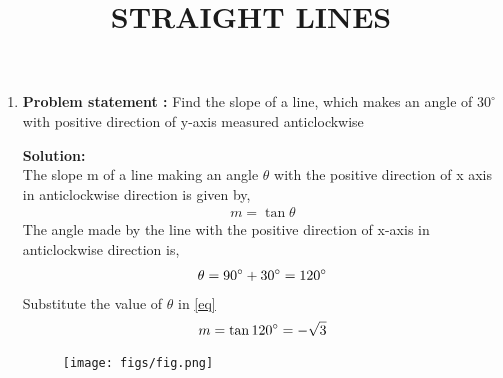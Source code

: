 \documentclass[12pt]{article}
\newcommand{\solution}{\noindent \textbf{Solution: }}
\begin{document}
\begin{center}
\title{\textbf{STRAIGHT LINES}}
\maketitle
\end{center}
\begin{enumerate}
\item\textbf{Problem statement :} Find the slope of a line, which makes an angle of $30^\circ$ with positive direction of y-axis measured anticlockwise

\solution
\\
The slope m of a line making an angle $\theta$ with the positive direction of x axis in anticlockwise direction is given by,
\begin{align}
    m=\tan\theta
    \label{eq}
\end{align}
The angle made by the line with the positive direction of x-axis in anticlockwise direction is,
\begin{align}
    \theta=90\degree + 30\degree=120\degree
\end{align}
Substitute the value of $\theta$ in \eqref{eq}
\begin{align}
        m=\tan120\degree = -\sqrt{3}
\end{align}
\begin{figure}[H]
 \begin{center}
  \texttt{[image: figs/fig.png]}
 \end{center}
\caption{}
\label{fig:Fig1}
\end{figure}
\end{enumerate}
\end{document}
